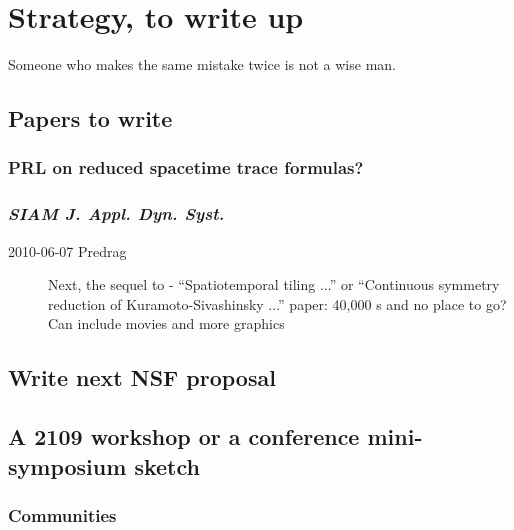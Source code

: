 
\chapter{Strategy, to write up}
\label{chap:strategy}

\begin{bartlett}{
Someone who makes the same mistake twice is not a wise man.
}
\end{bartlett}

\section{Papers to write}

\subsection{PRL on reduced spacetime trace formulas?}

\subsection{\emph{SIAM J. Appl. Dyn. Syst.}}

\begin{description}

\item[2010-06-07 Predrag] Next, the sequel to  -
``Spatiotemporal tiling ...'' or
``Continuous symmetry reduction of Kuramoto-Sivashinsky ...'' paper:
40,000 \rpo s and no place to go?
Can include movies and more graphics

\end{description}

\section{Write next NSF proposal}

\section{A 2109 workshop or a conference mini-symposium sketch}
\label{sect:workshop19}

\subsection{Communities}

